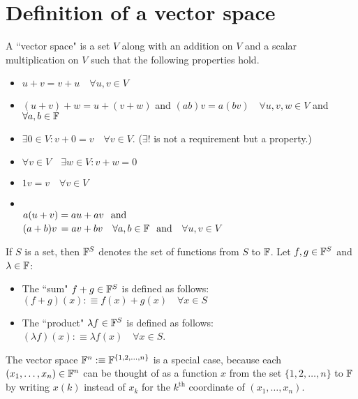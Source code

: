 \section{Definition of a vector space}

\setcounter{thm}{19}
\begin{mydef}
  A ``vector space" is a set $V$ along with an addition on $V$ and a scalar multiplication on $V$ such that the following properties hold.
  \begin{itemize}
    \item {}
    $ u+v = v+u \quad \forall u,v \in V$
    \item {}
    $(u+v)+w=u+(v+w)$ and $(ab)v=a(bv) \quad \forall u,v,w \in V$ and $\forall a,b \in \mathbb{F}$
    \item {}
    $\exists 0\in V:v+0=v \quad \forall v\in V$. ($\exists!$ is not a requirement but a property.)
    \item {}
    $\forall v\in V \quad \exists w\in V: v+w=0$
    \item {}
    $1v = v \quad \forall v\in V$
    \item {}\\
    $a(u+v) = au+av \;\;\, \text{and}\;\;$  \\
    $(a+b)v \, = av + bv \quad \forall a,b \in \mathbb{F} \;\;\, \text{and}\;\;$
    $\forall u,v \in V$
  \end{itemize}
\end{mydef}

\setcounter{thm}{23}
\begin{mydef}
  If $S$ is a set, then $\mathbb{F}^S$ denotes the set of functions from $S$ to $\mathbb{F}$. Let $f, g \in \mathbb{F}^{S}$ and $\lambda \in \mathbb{F}$:
  \begin{itemize}
    \item The ``sum" $f+g \in \mathbb{F}^{S}$ is defined as follows: $(f+g)(x) :\equiv f(x)+ g(x) \quad \forall x\in S$
    \item The ``product" $\lambda f \in \mathbb{F}^{S}$ is defined as follows: $(\lambda f)(x) :\equiv \lambda f(x) \quad \forall x \in S$.
  \end{itemize}
  The vector space $\mathbb{F}^{n} :\equiv \mathbb{F}^{\{1,2,\dots,n\}}$ is a special case, because each $(x_1, \dots, x_n) \in \mathbb{F}^{n}$ can be thought of as a function $x$ from the set $\{1, 2, \dots, n\}$ to $\mathbb{F}$ by writing $x(k)$ instead of $x_k$ for the $k^{\text{th}}$ coordinate of $(x_1, \dots, x_n)$.
\end{mydef}

